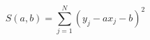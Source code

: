 \documentclass[A4,11pt]{article}
\begin{document}
\thispagestyle{empty}
$$
S(a, b) = \sum\limits_{j=1}^N (y_j- a x_j - b)^2
$$
\end{document}
